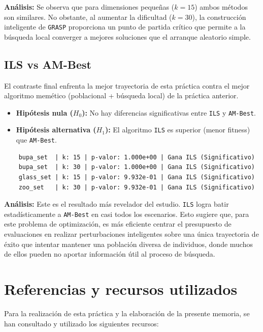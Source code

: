 \documentclass[a4paper,12pt]{article}%
\begin{document}
\noindent \textbf{Análisis:} Se observa que para dimensiones pequeñas ($k=15$) ambos métodos son similares. No obstante, al aumentar la dificultad ($k=30$), la construcción inteligente de \texttt{GRASP} proporciona un punto de partida crítico que permite a la búsqueda local converger a mejores soluciones que el arranque aleatorio simple.


\subsection*{ILS vs AM-Best}

El contraste final enfrenta la mejor trayectoria de esta práctica contra el mejor algoritmo memético (poblacional + búsqueda local) de la práctica anterior.
\begin{itemize}
	\item \textbf{Hipótesis nula ($H_0$):} No hay diferencias significativas entre \texttt{ILS} y \texttt{AM-Best}.
	\item \textbf{Hipótesis alternativa ($H_1$):} El algoritmo \texttt{ILS} es superior (menor fitness) que \texttt{AM-Best}.
\end{itemize}

{\footnotesize
\begin{verbatim}
	bupa_set  | k: 15 | p-valor: 1.000e+00 | Gana ILS (Significativo)
	bupa_set  | k: 30 | p-valor: 1.000e+00 | Gana ILS (Significativo)
	glass_set | k: 15 | p-valor: 9.932e-01 | Gana ILS (Significativo)
	zoo_set   | k: 30 | p-valor: 9.932e-01 | Gana ILS (Significativo)
\end{verbatim}
}

\noindent \textbf{Análisis:} Este es el resultado más revelador del estudio. \texttt{ILS} logra batir estadísticamente a \texttt{AM-Best} en casi todos los escenarios. Esto sugiere que, para este problema de optimización, es más eficiente centrar el presupuesto de evaluaciones en realizar perturbaciones inteligentes sobre una única trayectoria de éxito que intentar mantener una población diversa de individuos, donde muchos de ellos pueden no aportar información útil al proceso de búsqueda.

\newpage
\section{Referencias y recursos utilizados}

Para la realización de esta práctica y la elaboración de la presente memoria, se han consultado y utilizado los siguientes recursos:
\end{document}
